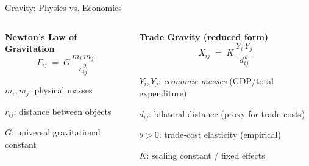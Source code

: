 \documentclass[notes,11pt, aspectratio=169, xcolor=table]{beamer}
\newenvironment{wideitemize}{\itemize\addtolength{\itemsep}{10pt}}{\enditemize}
\begin{document}
\begin{frame}{Gravity: Physics vs. Economics}
\begin{columns}[T]
\begin{column}{0.48\textwidth}
\textbf{Newton's Law of Gravitation}
\[
F_{ij} \;=\; G\,\frac{m_i\,m_j}{r_{ij}^{\,2}}
\]
\begin{wideitemize}
  \item $m_i, m_j$: physical masses
  \item $r_{ij}$: distance between objects
  \item $G$: universal gravitational constant
\end{wideitemize}
\end{column}
\begin{column}{0.48\textwidth}
\textbf{Trade Gravity (reduced form)}
\[
X_{ij} \;=\; K \,\frac{Y_i\,Y_j}{d_{ij}^{\,\theta}}
\]
\begin{wideitemize}
  \item $Y_i, Y_j$: \emph{economic masses} (GDP/total expenditure)
  \item $d_{ij}$: bilateral distance (proxy for trade costs)
  \item $\theta>0$: trade‐cost elasticity (empirical)
  \item $K$: scaling constant / fixed effects
\end{wideitemize}
\end{column}
\end{columns}
\end{frame}
\end{document}
